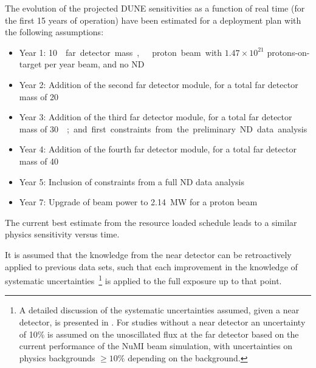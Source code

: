 The evolution of the projected DUNE sensitivities as a function of real time
(for the first \num{15} years of operation) have been estimated for a deployment plan
with the following assumptions:
\begin{itemize}
\item Year 1: \SI{10}\kt{} far detector mass,  
  proton beam with $1.47 \times 10^{21}$ protons-on-target per year
  beam, and no ND
\item Year 2: Addition of the second  far detector module, for a total far detector mass of
  \SI{20}\kt
\item Year 3: Addition of the third  far detector module, for a total far detector mass of
  \SI{30}\kt; and first constraints from the preliminary ND data analysis
\item Year 4: Addition of the fourth  far detector module, for a total far detector mass of
  \SI{40}\kt
\item Year 5: Inclusion of constraints from a full ND data analysis
 \item Year 7: Upgrade of beam power to \SI{2.14}{\MW} for a 
  proton beam
\end{itemize}
The current best estimate from the resource loaded schedule leads to a similar
physics sensitivity versus time.

It is assumed that the knowledge from the near detector can be
retroactively applied to previous data sets, such that each
improvement in the knowledge of systematic uncertainties~\footnote{A
  detailed discussion of the systematic uncertainties assumed, given a
  near detector, is presented in \volphys. For studies without a near
  detector an uncertainty of 10\% is assumed on the unoscillated flux
  at the far detector based on the current performance of the NuMI
  beam simulation, with uncertainties on physics backgrounds $\geq
  10\%$ depending on the background.} is applied to the full exposure
up to that point.

